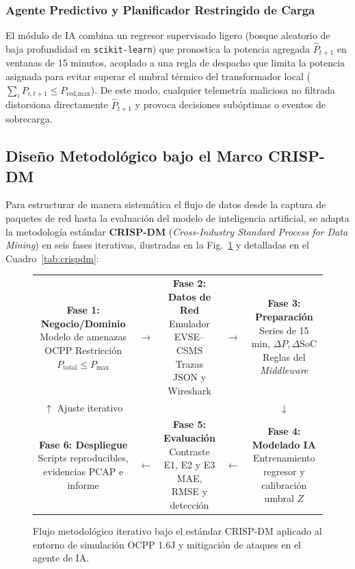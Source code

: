 \documentclass[conference]{IEEEtran}
\begin{document}
\subsubsection{Agente Predictivo y Planificador Restringido de Carga}
El módulo de IA combina un regresor supervisado ligero (bosque aleatorio de baja profundidad en \texttt{scikit-learn}) que pronostica la potencia agregada $\hat{P}_{t+1}$ en ventanas de 15 minutos, acoplado a una regla de despacho que limita la potencia asignada para evitar superar el umbral térmico del transformador local ($\sum_i P_{i,t+1} \le P_{\text{red,max}}$). De este modo, cualquier telemetría maliciosa no filtrada distorsiona directamente $\hat{P}_{t+1}$ y provoca decisiones subóptimas o eventos de sobrecarga.

\subsection{Diseño Metodológico bajo el Marco CRISP-DM}

Para estructurar de manera sistemática el flujo de datos desde la captura de paquetes de red hasta la evaluación del modelo de inteligencia artificial, se adapta la metodología estándar \textbf{CRISP-DM} (\textit{Cross-Industry Standard Process for Data Mining}) \cite{chapman2000} en seis fases iterativas, ilustradas en la Fig.~\ref{fig:crispdm} y detalladas en el Cuadro~\ref{tab:crispdm}:

\begin{figure}[t]
\centering
\footnotesize
\begin{tabular}{c c c c c}
\fbox{\parbox{3.1cm}{\centering \textbf{Fase 1: Negocio/Dominio}\\Modelo de amenazas OCPP\\Restricción $P_{\text{total}} \le P_{\max}$}}
& $\longrightarrow$ &
\fbox{\parbox{3.1cm}{\centering \textbf{Fase 2: Datos de Red}\\Emulador EVSE--CSMS\\Trazas JSON y Wireshark}}
& $\longrightarrow$ &
\fbox{\parbox{3.1cm}{\centering \textbf{Fase 3: Preparación}\\Series de 15 min, $\Delta P, \Delta \text{SoC}$\\Reglas del \textit{Middleware}}}
\\
$\uparrow$ \scriptsize{Ajuste iterativo} & & & & $\downarrow$ \\
\fbox{\parbox{3.1cm}{\centering \textbf{Fase 6: Despliegue}\\Scripts reproducibles,\\evidencias PCAP e informe}}
& $\longleftarrow$ &
\fbox{\parbox{3.1cm}{\centering \textbf{Fase 5: Evaluación}\\Contraste E1, E2 y E3\\MAE, RMSE y detección}}
& $\longleftarrow$ &
\fbox{\parbox{3.1cm}{\centering \textbf{Fase 4: Modelado IA}\\Entrenamiento regresor\\y calibración umbral $Z$}}
\end{tabular}
\caption{Flujo metodológico iterativo bajo el estándar CRISP-DM aplicado al entorno de simulación OCPP 1.6J y mitigación de ataques en el agente de IA.}
\label{fig:crispdm}
\end{figure}
\end{document}
